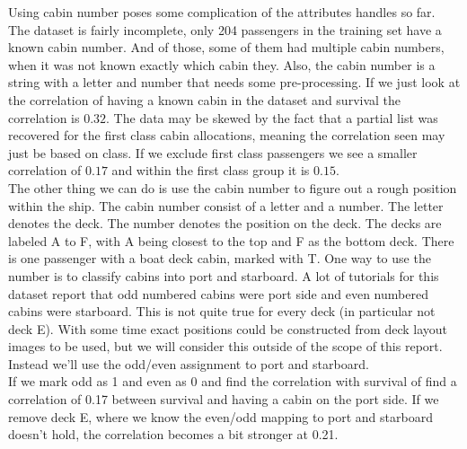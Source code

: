 \documentclass{llncs}
\begin{document}
Using cabin number poses some complication of the attributes handles so far. The dataset is fairly incomplete, only 204 passengers in the training set have a known cabin number. And of those, some of them had multiple cabin numbers, when it was not known exactly which cabin they. Also, the cabin number is a string with a letter and number that needs some pre-processing. If we just look at the correlation of having a known cabin in the dataset and survival the correlation is $0.32$.  The data may be skewed by the fact that a partial list was recovered for the first class cabin allocations\cite{cavelist}, meaning the correlation seen may just be based on class. If we exclude first class passengers we see a smaller correlation of $0.17$ and within the first class group it is $0.15$.\\
The other thing we can do is use the cabin number to figure out a rough position within the ship. The cabin number consist of a letter and a number. The letter denotes the deck. The number denotes the position on the deck. The decks are labeled A to F, with A being closest to the top and F as the bottom deck. There is one passenger with a boat deck cabin, marked with T. One way to use the number is to classify cabins into port and starboard. A lot of tutorials for this dataset report that odd numbered cabins were port side and even numbered cabins were starboard. This is not quite true for every deck (in particular not deck E). With some time exact positions could be constructed from deck layout images to be used, but we will consider this outside of the scope of this report. Instead we'll use the odd/even assignment to port and starboard.\\
If we mark odd as 1 and even as 0 and find the correlation with survival of find a correlation of 0.17 between survival and having a cabin on the port side. If we remove deck E, where we know the even/odd mapping to port and starboard doesn't hold, the correlation becomes a bit stronger at 0.21.
\end{document}
